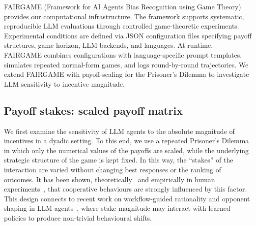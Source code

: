 \documentclass[a4paper,fleqn]{cas-sc}
\begin{document}
FAIRGAME (Framework for AI Agents Bias Recognition using Game Theory)~\cite{buscemi2025fairgame} provides our computational infrastructure. The framework supports systematic, reproducible LLM evaluations through controlled game-theoretic experiments. Experimental conditions are defined via JSON configuration files specifying payoff structures, game horizon, LLM backends, and languages. At runtime, FAIRGAME combines configurations with language-specific prompt templates, simulates repeated normal-form games, and logs round-by-round trajectories. We extend FAIRGAME with payoff-scaling for the Prisoner's Dilemma to investigate LLM sensitivity to incentive magnitude.

\subsection{Payoff stakes: scaled payoff matrix}\label{sec:gameImportance}

We first examine the sensitivity of LLM agents to the absolute magnitude of incentives in a dyadic setting. To this end, we use a repeated Prisoner's Dilemma in which only the numerical values of the payoffs are scaled, while the underlying strategic structure of the game is kept fixed. In this way, the ``stakes'' of the interaction are varied without changing best responses or the ranking of outcomes. It has been shown, theoretically~\cite{han_when_2021} and empirically in human experiments~\cite{krockow2016cooperation,list2006friend}, that cooperative behaviours are strongly influenced by this factor. This design connects to recent work on workflow-guided rationality and opponent shaping in LLM agents~\cite{hua2024gametheoretic}, where stake magnitude may interact with learned policies to produce non-trivial behavioural shifts.
\end{document}
